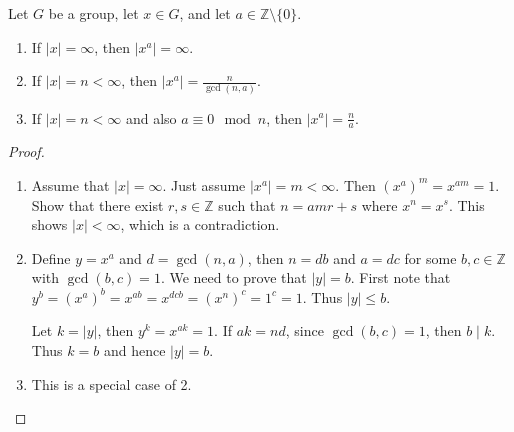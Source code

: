 \documentclass[11pt,a4paper]{article}
\begin{document}
\begin{prop}
    Let \( G \) be a group, let \( x \in G \), and let \( a \in \mathbb{Z}\setminus\{0\} \).
\begin{enumerate}[label=(\roman*)]
    \item If \( |x| = \infty \), then \( |x^a| = \infty \).
    \item If \( |x| = n < \infty \), then \( |x^a| = \frac{n}{\gcd(n, a)} \).
    \item If \( |x| = n < \infty \) and also \( a \equiv 0 \mod n \), then \( |x^a| = \frac{n}{a} \).
\end{enumerate}
\end{prop}


\begin{proof}
    \begin{enumerate}
        \item Assume that \( |x| = \infty \). Just assume \( |x^a| = m < \infty \). Then \( (x^a)^m = x^{am} = 1 \). Show that there exist \( r, s \in \mathbb{Z} \) such that \( n = amr + s \) where \( x^n = x^s \). This shows \( |x| < \infty \), which is a contradiction.
        
        \item Define \( y = x^a \) and \( d = \gcd(n, a) \), then \( n = db \) and \( a = dc \) for some \( b, c \in \mathbb{Z} \) with \( \gcd(b, c) = 1 \). We need to prove that \( |y| = b \). First note that \( y^b = (x^a)^b = x^{ab} = x^{dcb} = (x^n)^c = 1^c = 1 \). Thus \( |y| \leq b \).
        
        Let \( k = |y| \), then \( y^k = x^{ak} = 1 \). If \( ak = nd \), since \( \gcd(b, c) = 1 \), then \( b \mid k \). Thus \( k = b \) and hence \( |y| = b \).
        
        \item This is a special case of 2.
    \end{enumerate}
\end{proof}
\end{document}

